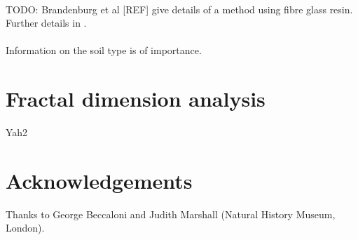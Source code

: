 \documentclass{article}
\begin{document}
   \paragraph{}
   TODO: Brandenburg et al [REF] give details of a method using fibre glass resin. Further details in \cite{brandenburg2002}.
   \paragraph{}
   Information on the soil type is of importance.
   \section{Fractal dimension analysis}
   Yah2
   
   \section{Acknowledgements}
   Thanks to George Beccaloni and Judith Marshall (Natural History Museum, London).
   \printbibliography{}
\end{document}
